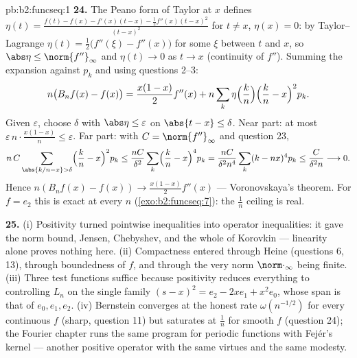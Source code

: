 \begin{solution}{pb:b2:funcseq:1}
\textbf{24.} The Peano form of Taylor at $x$ defines $\eta(t) =
\frac{f(t) - f(x) - f'(x)(t-x) - \frac12f''(x)(t-x)^2}
{(t-x)^2}$ for $t \neq x$, $\eta(x) = 0$: by Taylor--Lagrange
$\eta(t) = \frac12\bigl(f''(\xi) - f''(x)\bigr)$ for some $\xi$
between $t$ and $x$, so $\abs\eta \leq \norm{f''}_\infty$ and
$\eta(t) \to 0$ as $t \to x$ (continuity of $f''$). Summing
the expansion against $p_k$ and using questions 2--3:
\[
n\bigl(B_nf(x) - f(x)\bigr)
= \frac{x(1-x)}{2}f''(x)
+ n\sum_k\eta\Bigl(\frac kn\Bigr)\Bigl(\frac kn -
x\Bigr)^2p_k .
\]
Given $\varepsilon$, choose $\delta$ with $\abs\eta \leq
\varepsilon$ on $\abs{t - x}\leq\delta$. Near part: at most
$\varepsilon\,n\cdot\frac{x(1-x)}n \leq \varepsilon$. Far part:
with $C = \norm{f''}_\infty$ and question 23,
\[
n\,C\sum_{\abs{k/n-x}>\delta}\Bigl(\frac kn -
x\Bigr)^2p_k
\leq \frac{nC}{\delta^2}\sum_k\Bigl(\frac kn -
x\Bigr)^4p_k
= \frac{nC}{\delta^2 n^4}\sum_k(k-nx)^4p_k
\leq \frac{C}{\delta^2 n} \longrightarrow 0 .
\]
Hence $n(B_nf(x) - f(x)) \to \frac{x(1-x)}2f''(x)$ ---
Voronovskaya's theorem. For $f = e_2$ this is exact at every
$n$ (\cref{exo:b2:funcseq:7}): the $\frac1n$ ceiling is real.

\textbf{25.} (i) Positivity turned pointwise inequalities into
operator inequalities: it gave the norm bound, Jensen,
Chebyshev, and the whole of Korovkin --- linearity alone proves
nothing here. (ii) Compactness entered through Heine (questions
6, 13), through boundedness of $f$, and through the very norm
$\norm\cdot_\infty$ being finite. (iii) Three test functions
suffice because positivity reduces everything to controlling
$L_n$ on the single family $(s-x)^2 = e_2 - 2xe_1 + x^2e_0$,
whose span is that of $e_0, e_1, e_2$. (iv) Bernstein converges
at the honest rate $\omega(n^{-1/2})$ for every continuous $f$
(sharp, question 11) but saturates at $\frac1n$ for smooth $f$
(question 24); the Fourier chapter runs the same program for
periodic functions with Fej\'er's kernel --- another positive
operator with the same virtues and the same modesty.
\end{solution}
